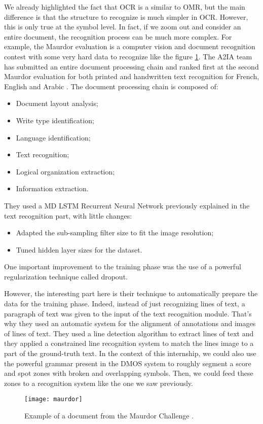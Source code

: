 \documentclass[11pt]{sdm}
\begin{document}
We already highlighted the fact that OCR is a similar to OMR, but the main difference is that the structure to recognize is much simpler in OCR.
However, this is only true at the symbol level.
In fact, if we zoom out and consider an entire document, the recognition process can be much more complex.
For example, the Maurdor evaluation \cite{_maurdor_2016} is a computer vision and document recognition contest with some very hard data to recognize like the figure \ref{maurdor}.
The A2IA team has submitted an entire document processing chain and ranked first at the second Maurdor evaluation for both printed and handwritten text recognition for French, English and Arabic \cite{moysset_a2ia_2014}.
The document processing chain is composed of:
\begin{itemize}
  \item Document layout analysis;
  \item Write type identification;
  \item Language identification;
  \item Text recognition;
  \item Logical organization extraction;
  \item Information extraction.
\end{itemize}
They used a MD LSTM Recurrent Neural Network previously explained in the text recognition part, with little changes:
\begin{itemize}
  \item Adapted the sub-sampling filter size to fit the image resolution;
  \item Tuned hidden layer sizes for the dataset.
\end{itemize}
One important improvement to the training phase was the use of a powerful regularization technique called dropout.

However, the interesting part here is their technique to automatically prepare the data for the training phase.
Indeed, instead of just recognizing lines of text, a paragraph of text was given to the input of the text recognition module.
That's why they used an automatic system for the alignment of annotations and images of lines of text.
They used a line detection algorithm to extract lines of text and they applied a constrained line recognition system to match the lines image to a part of the ground-truth text.
In the context of this internship, we could also use the powerful grammar present in the DMOS system to roughly segment a score and spot zones with broken and overlapping symbols.
Then, we could feed these zones to a recognition system like the one we saw previously.
\begin{figure}[btp]
  \centering
  \texttt{[image: maurdor]}
  \caption{\label{maurdor} Example of a document from the Maurdor Challenge \cite{moysset_a2ia_2014}. }
\end{figure}
\end{document}
